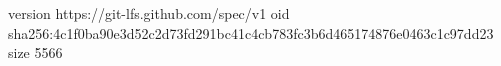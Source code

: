 version https://git-lfs.github.com/spec/v1
oid sha256:4c1f0ba90e3d52c2d73fd291bc41c4cb783fc3b6d465174876e0463c1c97dd23
size 5566
